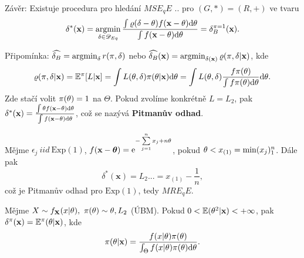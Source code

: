Závěr: Existuje procedura pro hledání $MSE_qE$ .. pro $(G,\ast)=(R,+)$ ve tvaru
$$ \delta^\ast(\textbf{x})=\mathop{\mathrm{argmin}}_{\delta\in\mathscr{D}_{Eq}}\frac{\int\varrho(\delta-\theta)f(\textbf{x}-\theta)\mathrm{d}\theta}{\int f(\textbf{x}-\theta)\mathrm{d}\theta}=\delta_B^{\pi=1}(\textbf{x}).$$

\begin{remark}
	Připomínka: $\widehat{\delta_B}=\mathop{\mathrm{argmin}}_\delta r(\pi,\delta)$ nebo $\widehat{\delta_B}(\textbf{x})=\mathop{\mathrm{argmin}}_{\delta(\textbf{x})}\varrho(\pi,\delta|\textbf{x})$, kde 
	$$ \varrho(\pi,\delta|\textbf{x})=\mathbb{E}^\pi[L|\textbf{x}]=\int L(\theta,\delta)\pi(\theta|\textbf{x})\mathrm{d}\theta=\int L(\theta,\delta)\frac{f \pi(\theta)}{\int f \pi(\theta)\mathrm{d}\theta}\mathrm{d}\theta.$$
 Zde stačí volit $\pi(\theta)=1$ na $\Theta$. Pokud zvolíme konkrétně $L=L_2$, pak $\delta^\ast(\textbf{x})=\frac{\int\theta f(\textbf{x}-\theta)\mathrm{d}\theta}{\int f(\textbf{x}-\theta)\mathrm{d}\theta}$, což se nazývá \textbf{Pitmanův odhad}.
\end{remark}
\begin{example}
	Mějme $\epsilon_j~iid~\mathrm{Exp}(1)$, $f(\textbf{x}-\boldsymbol{\theta})=\mathrm{e}^{-\sum\limits_{j=1}^{n} x_j+n\theta}$, pokud $\theta< x_{(1)}=\min (x_j)_1^n$. Dále pak
	$$ \delta^\ast(\textbf{x})\equal{L_2}...=x_{(1)}-\frac{1}{n},$$ což je Pitmanův odhad pro $\mathrm{Exp}(1)$, tedy $MRE_qE$.
\end{example}

\begin{theorem}\label{veta1}
	Mějme $X\sim f_{\textbf{X}}(x|\theta),~\pi(\theta)\sim \theta,L_2$ (ÚBM). Pokud $0<\mathbb{E}(\theta^2|\textbf{x})<+\infty$, pak $\delta^\pi(\textbf{x})=\mathbb{E}^\pi(\theta|\textbf{x})$, kde $$\pi(\theta|\textbf{x})=\frac{f(x|\theta)\pi(\theta)}{\int_\Theta f(x|\theta)\pi(\theta)\mathrm{d}\theta}.$$
\end{theorem}

